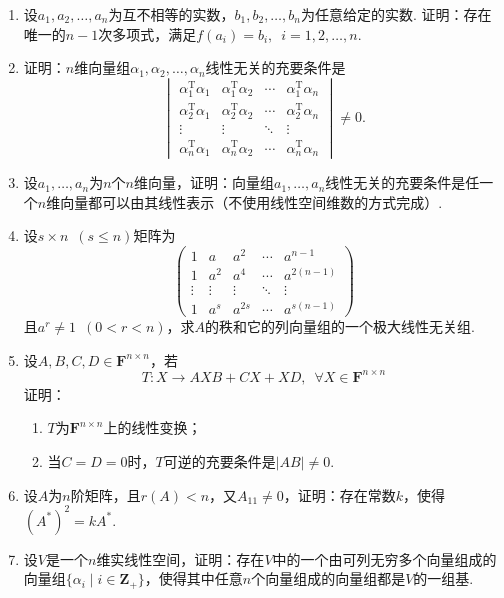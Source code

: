 \begin{enumerate}
    \item 设$a_1,a_2,\ldots,a_n$为互不相等的实数，$b_1,b_2,\ldots,b_n$为任意给定的实数. 证明：存在唯一的$n-1$次多项式，满足$f(a_i)=b_i,\enspace i=1,2,\ldots,n$.

    \item 证明：$n$维向量组$\alpha_1,\alpha_2,\ldots,\alpha_n$线性无关的充要条件是
          \[\begin{vmatrix}
                  \alpha_1^\mathrm{T}\alpha_1 & \alpha_1^\mathrm{T}\alpha_2 & \cdots & \alpha_1^\mathrm{T}\alpha_n \\
                  \alpha_2^\mathrm{T}\alpha_1 & \alpha_2^\mathrm{T}\alpha_2 & \cdots & \alpha_2^\mathrm{T}\alpha_n \\
                  \vdots                      & \vdots                      & \ddots & \vdots                      \\
                  \alpha_n^\mathrm{T}\alpha_1 & \alpha_n^\mathrm{T}\alpha_2 & \cdots & \alpha_n^\mathrm{T}\alpha_n
              \end{vmatrix}\neq 0.\]

    \item 设$a_1,\ldots,a_n$为$n$个$n$维向量，证明：向量组$a_1,\ldots,a_n$线性无关的充要条件是任一个$n$维向量都可以由其线性表示（不使用线性空间维数的方式完成）.

    \item 设$s \times n\enspace(s\leqslant n)$矩阵为
          \[\begin{pmatrix}
                  1      & a      & a^2    & \cdots & a^{n-1}    \\
                  1      & a^2    & a^4    & \cdots & a^{2(n-1)} \\
                  \vdots & \vdots & \vdots & \ddots & \vdots     \\
                  1      & a^s    & a^{2s} & \cdots & a^{s(n-1)}
              \end{pmatrix}\]
          且$a^r\neq 1\enspace(0<r<n)$，求$A$的秩和它的列向量组的一个极大线性无关组.

    \item 设$A,B,C,D \in \mathbf{F}^{n \times n}$，若
          \[T:X \to AXB+CX+XD,\enspace \forall X \in \mathbf{F}^{n \times n}\]
          证明：
          \begin{enumerate}
              \item $T$为$\mathbf{F}^{n \times n}$上的线性变换；

              \item 当$C=D=0$时，$T$可逆的充要条件是$|AB| \neq 0$.
          \end{enumerate}

    \item 设$A$为$n$阶矩阵，且$r(A) < n$，又$A_{11} \neq 0$，证明：存在常数$k$，使得$(A^*)^2=kA^*$.

    \item 设$V$是一个$n$维实线性空间，证明：存在$V$中的一个由可列无穷多个向量组成的向量组$\{\alpha_i \mid i\in\mathbf{Z}_+\}$，使得其中任意$n$个向量组成的向量组都是$V$的一组基.
\end{enumerate}


